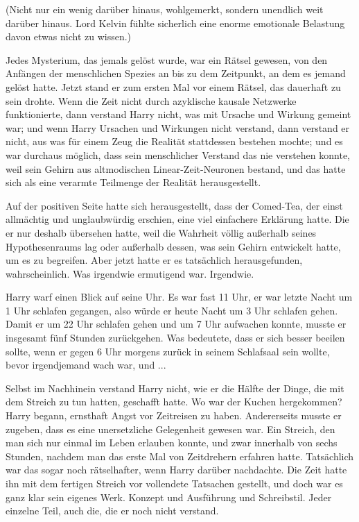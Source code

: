 (Nicht nur ein wenig darüber hinaus, wohlgemerkt, sondern unendlich weit darüber
hinaus. Lord Kelvin fühlte sicherlich eine enorme emotionale Belastung davon
etwas nicht zu wissen.)

Jedes Mysterium, das jemals gelöst wurde, war ein Rätsel gewesen, von den
Anfängen der menschlichen Spezies an bis zu dem Zeitpunkt, an dem es jemand
gelöst hatte. Jetzt stand er zum ersten Mal vor einem Rätsel, das dauerhaft zu
sein drohte. Wenn die Zeit nicht durch azyklische kausale Netzwerke
funktionierte, dann verstand Harry nicht, was mit Ursache und Wirkung gemeint
war; und wenn Harry Ursachen und Wirkungen nicht verstand, dann verstand er
nicht, aus was für einem Zeug die Realität stattdessen bestehen mochte; und es
war durchaus möglich, dass sein menschlicher Verstand das nie verstehen konnte,
weil sein Gehirn aus altmodischen Linear-Zeit-Neuronen bestand, und das hatte
sich als eine verarmte Teilmenge der Realität herausgestellt.

Auf der positiven Seite hatte sich herausgestellt, dass der Comed-Tea, der einst
allmächtig und unglaubwürdig erschien, eine viel einfachere Erklärung hatte. Die
er nur deshalb übersehen hatte, weil die Wahrheit völlig außerhalb seines
Hypothesenraums lag oder außerhalb dessen, was sein Gehirn entwickelt hatte, um
es zu begreifen. Aber jetzt hatte er es tatsächlich herausgefunden,
wahrscheinlich. Was irgendwie ermutigend war. Irgendwie.

Harry warf einen Blick auf seine Uhr. Es war fast 11 Uhr, er war letzte Nacht um
1 Uhr schlafen gegangen, also würde er heute Nacht um 3 Uhr schlafen gehen.
Damit er um 22 Uhr schlafen gehen und um 7 Uhr aufwachen konnte, musste er
insgesamt fünf Stunden zurückgehen. Was bedeutete, dass er sich besser beeilen
sollte, wenn er gegen 6 Uhr morgens zurück in seinem Schlafsaal sein wollte,
bevor irgendjemand wach war, und ...

Selbst im Nachhinein verstand Harry nicht, wie er die Hälfte der Dinge, die mit
dem Streich zu tun hatten, geschafft hatte. Wo war der Kuchen hergekommen? Harry
begann, ernsthaft Angst vor Zeitreisen zu haben. Andererseits musste er zugeben,
dass es eine unersetzliche Gelegenheit gewesen war. Ein Streich, den man sich
nur einmal im Leben erlauben konnte, und zwar innerhalb von sechs Stunden,
nachdem man das erste Mal von Zeitdrehern erfahren hatte. Tatsächlich war das
sogar noch rätselhafter, wenn Harry darüber nachdachte. Die Zeit hatte ihn mit
dem fertigen Streich vor vollendete Tatsachen gestellt, und doch war es ganz
klar sein eigenes Werk. Konzept und Ausführung und Schreibstil. Jeder einzelne
Teil, auch die, die er noch nicht verstand.

